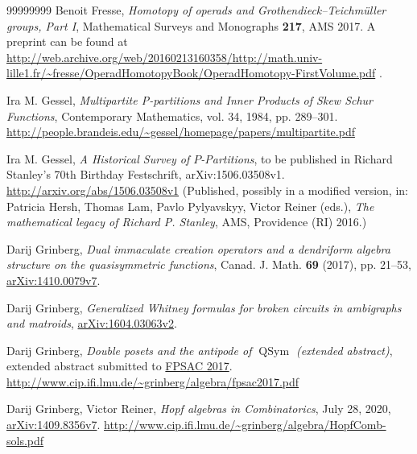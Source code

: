 \documentclass[numbers=enddot,12pt,final,onecolumn,notitlepage,abstracton]{scrartcl}
\theoremstyle{definition}
\newcommand{\QSym}{{\operatorname{QSym}}}
\begin{document}
\begin{thebibliography}{99999999}
Benoit Fresse, \textit{Homotopy of operads and
Grothendieck--Teichm\"{u}ller groups, Part I},
Mathematical Surveys and Monographs \textbf{217},
AMS 2017.
A preprint can be found at
\url{http://web.archive.org/web/20160213160358/http://math.univ-lille1.fr/~fresse/OperadHomotopyBook/OperadHomotopy-FirstVolume.pdf} .

Ira M. Gessel, \textit{Multipartite
P-partitions and Inner Products of Skew Schur Functions}, Contemporary
Mathematics, vol. 34, 1984, pp. 289--301.\newline%
\url{http://people.brandeis.edu/~gessel/homepage/papers/multipartite.pdf}

Ira M. Gessel, \textit{A Historical Survey of
$P$-Partitions}, to be published in Richard Stanley's 70th Birthday Festschrift,
arXiv:1506.03508v1.\newline
\url{http://arxiv.org/abs/1506.03508v1}
\newline (Published, possibly in a modified version, in:
Patricia Hersh, Thomas Lam, Pavlo Pylyavskyy, Victor Reiner (eds.),
\textit{The mathematical legacy of Richard P. Stanley},
AMS, Providence (RI) 2016.)


Darij Grinberg,
\textit{Dual immaculate creation operators and a dendriform algebra
structure on the quasisymmetric functions},
Canad. J. Math. \textbf{69} (2017), pp. 21--53,
\href{http://arxiv.org/abs/1410.0079v7}{arXiv:1410.0079v7}.

Darij Grinberg,
\textit{Generalized Whitney formulas for
broken circuits in ambigraphs and
matroids},
\href{https://arxiv.org/abs/1604.03063v2}{arXiv:1604.03063v2}.

Darij Grinberg, \textit{Double posets and the antipode of $\QSym$
(extended abstract)},
extended abstract submitted to \href{https://sites.google.com/site/fpsac2017/}{FPSAC 2017}.
\url{http://www.cip.ifi.lmu.de/~grinberg/algebra/fpsac2017.pdf}

Darij Grinberg, Victor Reiner, \textit{Hopf algebras
in Combinatorics}, July 28, 2020,
\href{https://arxiv.org/abs/1409.8356v7}{arXiv:1409.8356v7}.\newline
\url{http://www.cip.ifi.lmu.de/~grinberg/algebra/HopfComb-sols.pdf}


\end{thebibliography}
\end{document}
